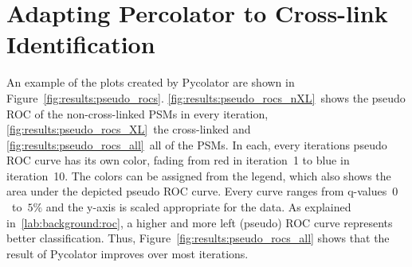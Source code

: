 \section{Adapting Percolator to Cross-link Identification}
\label{lab:results:pseudo_rocs}
An example of the plots created by Pycolator are shown in Figure~\ref{fig:results:pseudo_rocs}. \ref{fig:results:pseudo_rocs_nXL}~shows the pseudo ROC of the non-cross-linked PSMs in every iteration, \ref{fig:results:pseudo_rocs_XL}~the cross-linked and \ref{fig:results:pseudo_rocs_all}~all of the PSMs. In each, every iterations pseudo ROC curve has its own color, fading from red in iteration~1 to blue in iteration~10. The colors can be assigned from the legend, which also shows the area under the depicted pseudo ROC curve. Every curve ranges from q-values~$0$~to~$5\%$ and the y-axis is scaled appropriate for the data. As explained in~\ref{lab:background:roc}, a higher and more left (pseudo) ROC curve represents better classification. Thus, Figure~\ref{fig:results:pseudo_rocs_all} shows that the result of Pycolator improves over most iterations.\\
\renewcommand{\baselinestretch}{0.9}
